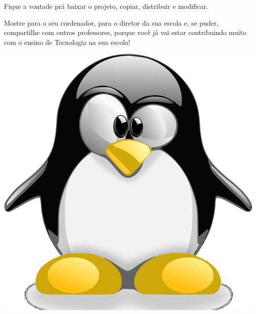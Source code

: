 \begin{multicols}{2}
Fique a vontade prá baixar o projeto, copiar, distribuir e modificar.

Mostre para o seu cordenador, para o diretor da sua escola e, se puder, compartilhe com outros professores, porque você já vai estar contribuindo muito com o ensino de Tecnologia na sua escola!

	\begin{center}
	
	\includegraphics[width=.4\linewidth]{./IMG-GIT/tux.png}

\end{center}
\vfill
\end{multicols}

\pagebreak